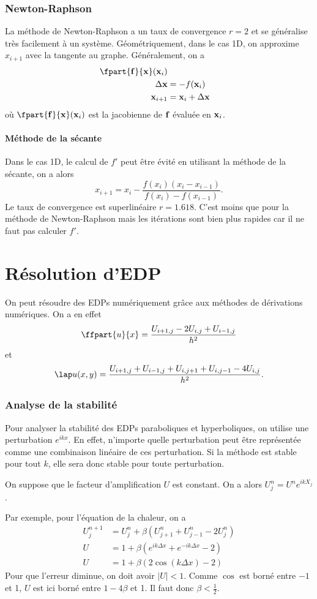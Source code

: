\section{Newton-Raphson}
La méthode de Newton-Raphson a un taux de convergence $r = 2$ et
se généralise très facilement à un système.
Géométriquement, dans le cas 1D,
on approxime $x_{i+1}$ avec la tangente au graphe.
Généralement, on a
\begin{align*}
  \fpart{\fv{f}}{\fv{x}}(\fv{x}_i)\\
  \Delta \fv{x} & = -f(\fv{x}_i)\\
  \fv{x}_{i+1} & = \fv{x}_i + \Delta \fv{x}
\end{align*}
où $\fpart{\fv{f}}{\fv{x}}(\fv{x}_i)$ est la jacobienne de ${\bf f}$ évaluée
en ${\bf x}_i$.

\subsection{Méthode de la sécante}
Dans le cas 1D,
le calcul de $f'$ peut être évité en utilisant la méthode
de la sécante, on a alors
\[ x_{i+1} = x_i - \frac{f(x_i)(x_i - x_{i-1})}
{f(x_i) - f(x_{i-1})}. \]
Le taux de convergence est superlinéaire $r = 1.618$.
C'est moins que pour la méthode de Newton-Raphson mais les itérations
sont bien plus rapides car il ne faut pas calculer $f'$.

\part{Résolution d'EDP}
On peut résoudre des EDPs numériquement grâce aux méthodes de dérivations
numériques.
On a en effet
\[ \ffpart{u}{x} = \frac{U_{i+1,j} - 2 U_{i,j} + U_{i-1,j}}{h^2} \]
et
\[ \lap u(x, y) =
\frac{U_{i+1,j} + U_{i-1,j} + U_{i,j+1} + U_{i,j-1} -4U_{i,j}}{h^2}. \]

\section{Analyse de la stabilité}
Pour analyser la stabilité des EDPs paraboliques et hyperboliques,
on utilise une perturbation $e^{ikx}$.
En effet, n'importe quelle perturbation peut être représentée
comme une combinaison linéaire de ces perturbation.
Si la méthode est stable pour tout $k$,
elle sera donc stable pour toute perturbation.

On suppose que le facteur d'amplification $U$ est constant.
On a alors $U_j^n = U^n e^{ikX_j}$.

Par exemple, pour l'équation de la chaleur, on a
\begin{align*}
  U_j^{n+1} & = U_j^n + \beta(U_{j+1}^n + U_{j-1}^n - 2U_j^n)\\
  U & = 1 + \beta(e^{ik\Delta x} + e^{-ik\Delta x} - 2)\\
  U & = 1 + \beta(2\cos(k\Delta x) - 2)
\end{align*}
Pour que l'erreur diminue, on doit avoir $|U| < 1$.
Comme $\cos$ est borné entre $-1$ et 1, $U$ est ici borné entre
$1 - 4\beta$ et 1.
Il faut donc $\beta < \frac{1}{2}$.

